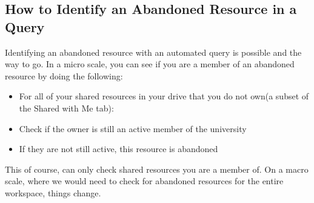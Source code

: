 \documentclass{article}
\begin{document}
\subsection*{How to Identify an Abandoned Resource in a Query}
Identifying an abandoned resource with an automated query is possible and the way to go.
In a micro scale, you can see if you are a member of an abandoned resource by doing the following:
\begin{tcolorbox}
    \begin{itemize}
        \item For all of your shared resources in your drive that you do not own(a subset of the Shared with Me tab):
        \item Check if the owner is still an active member of the university
        \item If they are not still active, this resource is abandoned
    \end{itemize}
\end{tcolorbox}
This of course, can only check shared resources you are a member of.
On a macro scale, where we would need to check for abandoned resources for the entire workspace, things change.
\end{document}
